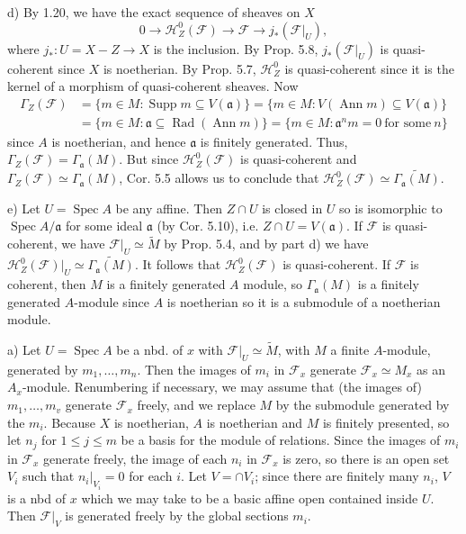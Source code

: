 \documentclass{report}
\newcommand{\F}{\mathcal{F}}
\DeclareMathOperator{\Supp}{Supp}
\DeclareMathOperator{\Spec}{Spec}
\DeclareMathOperator{\Ann}{Ann}
\DeclareMathOperator{\Rad}{Rad}
\begin{document}
\noindent
d)	By 1.20, we have the exact sequence of sheaves on $X$
$$0\rightarrow \mathscr{H}^0_Z(\F)\rightarrow \F\rightarrow j_*(\F\big|_U),$$
where $j_*:U=X-Z\rightarrow X$ is the inclusion.	By Prop. 5.8, $j_*(\F\big|_U)$
is quasi-coherent since $X$ is noetherian.
By Prop. 5.7, $\mathscr{H}_Z^0$ is quasi-coherent since it is the kernel
of a morphism of quasi-coherent sheaves.	
Now 
\begin{align*}
\Gamma_Z(\F)&=\{m\in M: \Supp m\subseteq V(\mathfrak{a})\}=\{m\in M: V(\Ann m)\subseteq V(\mathfrak{a})\}\\
&=\{m\in M: \mathfrak{a}\subseteq \Rad(\Ann m)\}=\{m\in M:\mathfrak{a}^nm=0\ \text{for some}\ n\}
\end{align*}
since $A$ is noetherian, and hence $\mathfrak{a}$ is finitely generated.  Thus, $\Gamma_Z(\F)=\Gamma_{\mathfrak{a}}(M)$.
But since $\mathscr{H}_Z^0(\F)$ is quasi-coherent and $\Gamma_Z(\F)\simeq \Gamma_{\mathfrak{a}}(M)$,
Cor. 5.5 allows us to conclude that $\mathscr{H}_Z^0(\F)\simeq \widetilde{\Gamma_{\mathfrak{a}}(M)}$.

\noindent
e)	Let $U=\Spec A$ be any affine.  Then $Z\cap U$ is closed in $U$ so is isomorphic to $\Spec A/{\mathfrak{a}}$
for some ideal $\mathfrak{a}$ (by Cor. 5.10), i.e. $Z\cap U=V(\mathfrak{a})$.
If $\F$ is quasi-coherent, we have $\F\big|_U\simeq \widetilde{M}$ by Prop. 5.4, and by part d)
we have $\mathscr{H}_Z^0(\F)\big|_U\simeq \widetilde{\Gamma_{\mathfrak{a}} (M)}$.
It follows that $\mathscr{H}_Z^0(\F)$ is quasi-coherent.	If $\F$ is coherent,
then $M$ is a finitely generated $A$ module, so $\Gamma_{\mathfrak{a}}(M)$ is a finitely generated $A$-module since
$A$ is noetherian so it is a submodule of a noetherian module.

\bigskip
{} a)	Let $U=\Spec A$ be a nbd. of $x$ with $\F|_U\simeq \widetilde{M}$, with $M$ a finite $A$-module,
generated by $m_1,\ldots,m_n$.  Then the images of $m_i$ in $\F_x$ generate $\F_x\simeq M_x$ as an $A_x$-module.
Renumbering if necessary, we may assume that (the images of) $m_1,\ldots,m_v$ generate $\F_x$ freely, and we replace
$M$ by the submodule generated by the $m_i$.
Because $X$ is noetherian, $A$ is noetherian and $M$ is finitely presented, so let $n_j$ for $1\le j\le m$
be a basis for the module of relations.  Since the images of $m_i$ in $\F_x$ generate freely, the image of each $n_i$
in $\F_x$ is zero, so there is an open set $V_i$ such that $n_i\big|_{V_i}=0$ for each $i$.
 Let $V=\cap V_i$; since there are finitely many $n_i$, $V$ is a nbd of $x$ which we may take to be a basic affine open contained inside $U$.
Then $\F\big|_V$ is generated freely by the global sections $m_i$.
\end{document}
